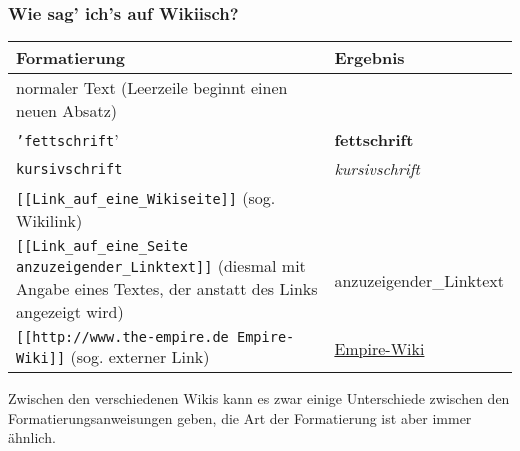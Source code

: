 \documentclass{beamer}
\begin{document}
\begin{frame}
  \frametitle{Wie sag’ ich’s auf Wikiisch?}
  \begin{longtable}{|l|l|}
    \hline
    \textbf{Formatierung                                                       } & \textbf{Ergebnis                      } \\ 
    \hline
     
    normaler Text (Leerzeile beginnt einen neuen Absatz)                &                                \\ 
    \hline
     
    \texttt{'fettschrift}'                                                   & \textbf{fettschrift}                \\ 
    \hline
     
    \texttt{kursivschrift}                                                   & \emph{kursivschrift}                \\ 
    \hline
     
    \texttt{[[Link\_auf\_eine\_Wikiseite]]} (sog. Wikilink)                       &     \\ 
    \hline
     
    \texttt{[[Link\_auf\_eine\_Seite anzuzeigender\_Linktext]]} (diesmal mit Angabe eines Textes, der anstatt des Links angezeigt wird)                    &  anzuzeigender\_Linktext \\ 
    \hline
     
    \texttt{[[http://www.the-empire.de Empire-Wiki]]} (sog. externer Link)     & \href{http://www.the-empire.de}{ Empire-Wiki} \\ 
    \hline
     
  \end{longtable}

  Zwischen den verschiedenen Wikis kann es zwar einige Unterschiede zwischen den Formatierungsanweisungen geben, die Art der Formatierung ist aber immer ähnlich.
\end{frame}
\end{document}
